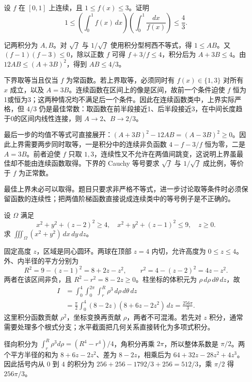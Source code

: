 \documentclass[UTF8,12pt,a4paper,fontset=fandol]{ctexart}
\begin{document}
\begin{example}\label{nm-2018-3}
设 $f$ 在 $[0,1]$ 上连续，且 $1\leq f(x)\leq3$。证明
\[
 1\leq\left(\int_0^1f(x)\,dx\right)
          \left(\int_0^1\frac{dx}{f(x)}\right)\leq\frac43.
\]
\end{example}
\begin{solve}
记两积分为 $A,B$。对 $\sqrt f$ 与 $1/\sqrt f$ 使用积分型柯西不等式，得 $1\leq AB$。又 $(f-1)(f-3)\leq0$，除以正数 $f$ 可得 $f+3/f\leq4$，积分后为 $A+3B\leq4$。由 $12AB\leq(A+3B)^2$，得到 $AB\leq4/3$。

下界取等当且仅当 $f$ 为常函数。若上界取等，必须同时有 $f(x)\in\{1,3\}$ 对所有 $x$ 成立，以及 $A=3B$。连续函数在区间上的像是区间，故前一个条件迫使 $f$ 恒为1或恒为3；这两种情况均不满足后一个条件。因此在连续函数类中，上界实际严格，但 $4/3$ 仍是最佳常数：取函数在前半段接近1、后半段接近3，在中间长度趋于0的区间内线性连接，则 $A\to2$、$B\to2/3$。

最后一步的均值不等式可直接展开：$(A+3B)^2-12AB=(A-3B)^2\ge0$。因此上界需要两步同时取等，一是积分中的连续非负函数 $4-f-3/f$ 恒为零，二是 $A=3B$。前者迫使 $f$ 只取 $1,3$，连续性又不允许在两值间跳变，这说明上界虽最佳却不能由连续函数取得。下界的 Cauchy 等号要求 $\sqrt f$ 与 $1/\sqrt f$ 成比例，等价于 $f$ 为正常数。

\end{solve}
\begin{remark}
最佳上界未必可以取得。题目只要求非严格不等式，进一步讨论取等条件时必须保留函数的连续性；把两值阶梯函数直接说成连续类中的等号例子是不正确的。
\end{remark}

\begin{example}\label{nm-2018-4}
设 $\Omega$ 满足
\[
 x^2+y^2+(z-2)^2\geq4,\quad
 x^2+y^2+(z-1)^2\leq9,\quad z\geq0.
\]
求 $\displaystyle\iiint_\Omega(x^2+y^2)\,dx\,dy\,dz$。
\end{example}
\begin{solve}
固定高度 $z$，区域是同心圆环。两球在顶部 $z=4$ 内切，允许高度为 $0\leq z\leq4$。外、内半径的平方分别为
\[
 R^2=9-(z-1)^2=8+2z-z^2,
 \qquad r^2=4-(z-2)^2=4z-z^2.
\]
两者在该区间非负，且 $R^2-r^2=8-2z\geq0$。柱坐标的体积元为 $\rho\,d\rho\,d\theta\,dz$，故
\begin{align*}
 I&=\int_0^4\int_0^{2\pi}\int_r^R\rho^3\,d\rho\,d\theta\,dz\\
 &=\frac\pi2\int_0^4(8-2z)(8+6z-2z^2)\,dz
 =\frac{256\pi}{3}.
\end{align*}
这里积分函数贡献 $\rho^2$，坐标变换再贡献 $\rho$，两者不可混淆。若先对 $z$ 积分，通常需要处理多个根式分支；水平截面把几何关系直接转化为多项式积分。

径向积分为 $\int_r^R\rho^3d\rho=(R^4-r^4)/4$，角积分再乘 $2\pi$，所以整体系数是 $\pi/2$。两个平方半径的和为 $8+6z-2z^2$、差为 $8-2z$，相乘后为 $64+32z-28z^2+4z^3$。因此括号内从 $0$ 到 $4$ 的积分为 $256+256-1792/3+256=512/3$，乘 $\pi/2$ 得 $256\pi/3$。

\end{solve}
\end{document}
